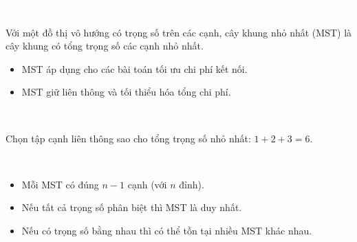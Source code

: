 \documentclass{beamer}
\newcommand{\hlblue}[1]{\textcolor{myblue}{#1}}
\newcommand{\hlgreen}[1]{\textcolor{mygreen}{#1}}
\newcommand{\hlred}[1]{\textcolor{myred}{#1}}
\newcommand{\hlpurple}[1]{\textcolor{mypurple}{#1}}
\newcommand{\hlorange}[1]{\textcolor{myorange}{#1}}
\newcommand{\hlwhite}[1]{\textcolor{white}{#1}}
\begin{document}

\begin{frame}{\hlwhite{Cây khung nhỏ nhất (MST)}}
\begin{tcolorbox}[title=\textbf{\hlgreen{Khái niệm}}]
Với một đồ thị vô hướng có \hlpurple{trọng số} trên các cạnh, \hlblue{cây khung nhỏ nhất (MST)} là cây khung có \hlred{tổng trọng số các cạnh nhỏ nhất}.
\end{tcolorbox}

\begin{itemize}
  \item MST áp dụng cho các bài toán \hlorange{tối ưu chi phí kết nối}.
  \item MST giữ \hlgreen{liên thông} và \hlred{tối thiểu hóa tổng chi phí}.
\end{itemize}
\end{frame}


\begin{frame}{\hlwhite{Ví dụ minh họa MST}}
\centering
{}

\vspace{0.25cm}
\hlpurple{Chọn tập cạnh liên thông sao cho tổng trọng số nhỏ nhất: \(1 + 2 + 3 = 6\).}
\end{frame}


\begin{frame}{\hlwhite{Tính chất quan trọng của MST}}
\begin{itemize}
  \item Mỗi MST có đúng \hlred{$n-1$ cạnh} (với \hlblue{$n$ đỉnh}).
  \item Nếu tất cả trọng số \hlgreen{phân biệt} thì MST là \hlred{duy nhất}.
  \item Nếu có trọng số \hlorange{bằng nhau} thì có thể tồn tại \hlpurple{nhiều MST khác nhau}.
\end{itemize}
\end{frame}
\end{document}
